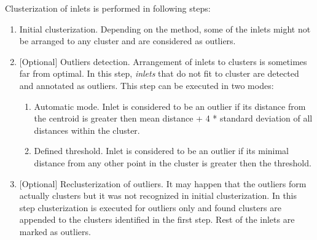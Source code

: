 \documentclass[a4paper,10pt,english]{sphinxmanual}
\begin{document}
Clusterization of inlets is performed in following steps:
\begin{enumerate}
\item {} 
Initial clusterization. Depending on the method, some of the inlets might not be arranged to any cluster and are considered as outliers.

\item {} 
{[}Optional{]} Outliers detection. Arrangement of inlets to clusters is sometimes far from optimal. In this step, \emph{inlets} that do not fit to cluster are detected and annotated as outliers. This step can be executed in two modes:
\begin{enumerate}
\item {} 
Automatic mode. Inlet is considered to be an outlier if its distance from the centroid is greater then mean distance + 4 * standard deviation of all distances within the cluster.

\item {} 
Defined threshold. Inlet is considered to be an outlier if its minimal distance from any other point in the cluster is greater then the threshold.

\end{enumerate}

\item {} 
{[}Optional{]} Reclusterization of outliers. It may happen that the outliers form actually clusters but it was not recognized in initial clusterization. In this step clusterization is executed for outliers only and found clusters are appended to the clusters identified in the first step. Rest of the inlets are marked as outliers.

\end{enumerate}
\end{document}
